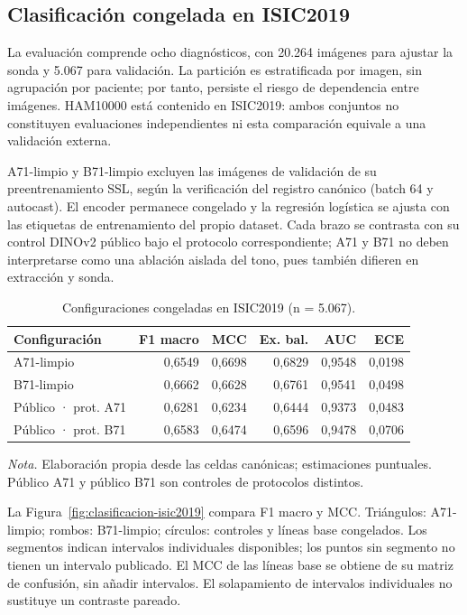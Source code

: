 \subsection{Clasificación congelada en ISIC2019}
\label{sec:clasificacion-isic2019}

La evaluación comprende ocho diagnósticos, con 20.264 imágenes para ajustar la sonda y 5.067 para validación. La partición es estratificada por imagen, sin agrupación por paciente; por tanto, persiste el riesgo de dependencia entre imágenes. HAM10000 está contenido en ISIC2019: ambos conjuntos no constituyen evaluaciones independientes ni esta comparación equivale a una validación externa.

A71-limpio y B71-limpio excluyen las imágenes de validación de su preentrenamiento SSL, según la verificación del registro canónico (batch 64 y autocast). El encoder permanece congelado y la regresión logística se ajusta con las etiquetas de entrenamiento del propio dataset. Cada brazo se contrasta con su control DINOv2 público bajo el protocolo correspondiente; A71 y B71 no deben interpretarse como una ablación aislada del tono, pues también difieren en extracción y sonda.

\begin{table}[!htbp]
\centering
\caption{Configuraciones congeladas en ISIC2019 (n = 5.067).}
\label{tab:clasificacion-isic2019}
\begingroup\fontsize{11}{13}\selectfont\singlespacing
\begin{tabularx}{\textwidth}{@{}Lrrrrr@{}}
\toprule
Configuración & F1 macro & MCC & Ex. bal. & AUC & ECE \\
\midrule
A71-limpio & 0,6549 & 0,6698 & 0,6829 & 0,9548 & 0,0198 \\
B71-limpio & 0,6662 & 0,6628 & 0,6761 & 0,9541 & 0,0498 \\
Público · prot. A71 & 0,6281 & 0,6234 & 0,6444 & 0,9373 & 0,0483 \\
Público · prot. B71 & 0,6583 & 0,6474 & 0,6596 & 0,9478 & 0,0706 \\
\bottomrule
\end{tabularx}
\par\smallskip\raggedright\textit{Nota.} Elaboración propia desde las celdas canónicas; estimaciones puntuales. Público A71 y público B71 son controles de protocolos distintos.\par\endgroup
\end{table}
La Figura~\ref{fig:clasificacion-isic2019} compara F1 macro y MCC. Triángulos: A71-limpio; rombos: B71-limpio; círculos: controles y líneas base congelados. Los segmentos indican intervalos individuales disponibles; los puntos sin segmento no tienen un intervalo publicado. El MCC de las líneas base se obtiene de su matriz de confusión, sin añadir intervalos. El solapamiento de intervalos individuales no sustituye un contraste pareado.

